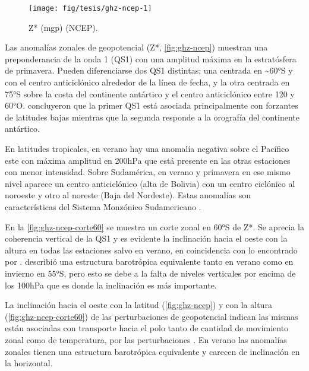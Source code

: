\documentclass[spanish,a4paper,12pt,oneside]{book}
\begin{document}
\begin{landscape}\begin{figure}

{\centering \texttt{[image: fig/tesis/ghz-ncep-1]} 

}

\caption{Z* (mgp) (NCEP).}\label{fig:ghz-ncep}
\end{figure}
\end{landscape}

Las anomalías zonales de geopotencial (Z*, \autoref{fig:ghz-ncep})
muestran una preponderancia de la onda 1 (QS1) con una amplitud máxima
en la estratósfera de primavera. Pueden diferenciarse dos QS1 distintas;
una centrada en \textasciitilde{}60°S y con el centro anticiclónico
alrededor de la línea de fecha, y la otra centrada en 75°S sobre la
costa del continente antártico y el centro anticiclónico entre 120 y
60°O. \citet{Quintanar1995} concluyeron que la primer QS1 está asociada
principalmente con forzantes de latitudes bajas mientras que la segunda
responde a la orografía del continente antártico.

En latitudes tropicales, en verano hay una anomalía negativa sobre el
Pacífico este con máxima amplitud en 200hPa que está presente en las
otras estaciones con menor intensidad. Sobre Sudamérica, en verano y
primavera en ese mismo nivel aparece un centro anticiclónico (alta de
Bolivia) con un centro ciclónico al noroeste y otro al noreste (Baja del
Nordeste). Estas anomalías son características del Sistema Monzónico
Sudamericano \citep{Vera2006}.

En la \autoref{fig:ghz-ncep-corte60} se muestra un corte zonal en 60°S
de Z*. Se aprecia la coherencia vertical de la QS1 y es evidente la
inclinación hacia el oeste con la altura en todas las estaciones salvo
en verano, en coincidencia con lo encontrado por \citet{Quintanar1995a}.
\citet{Karoly1985} describió una estructura barotrópica equivalente
tanto en verano como en invierno en 55°S, pero esto se debe a la falta
de niveles verticales por encima de los 100hPa que es donde la
inclinación es más importante.

La inclinación hacia el oeste con la latitud (\autoref{fig:ghz-ncep}) y
con la altura (\autoref{fig:ghz-ncep-corte60}) de las perturbaciones de
geopotencial indican las mismas están asociadas con transporte hacia el
polo tanto de cantidad de movimiento zonal como de temperatura, por las
perturbaciones \citep{James}. En verano las anomalías zonales tienen una
estructura barotrópica equivalente y carecen de inclinación en la
horizontal.
\end{document}
